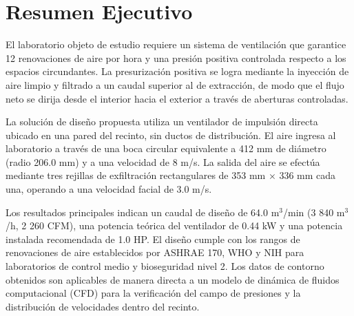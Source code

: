 \newpage
\section*{Resumen Ejecutivo}

El laboratorio objeto de estudio requiere un sistema de ventilación que garantice 12 renovaciones de aire por hora y una presión positiva controlada respecto a los espacios circundantes. La presurización positiva se logra mediante la inyección de aire limpio y filtrado a un caudal superior al de extracción, de modo que el flujo neto se dirija desde el interior hacia el exterior a través de aberturas controladas.

La solución de diseño propuesta utiliza un ventilador de impulsión directa ubicado en una pared del recinto, sin ductos de distribución. El aire ingresa al laboratorio a través de una boca circular equivalente a 412 mm de diámetro (radio 206.0 mm) y a una velocidad de 8 m/s. La salida del aire se efectúa mediante tres rejillas de exfiltración rectangulares de 353 mm $\times$ 336 mm cada una, operando a una velocidad facial de 3.0 m/s.

Los resultados principales indican un caudal de diseño de 64.0 m$^3$/min (3 840 m$^3$/h, 2 260 CFM), una potencia teórica del ventilador de 0.44 kW y una potencia instalada recomendada de 1.0 HP. El diseño cumple con los rangos de renovaciones de aire establecidos por ASHRAE 170, WHO y NIH para laboratorios de control medio y bioseguridad nivel 2. Los datos de contorno obtenidos son aplicables de manera directa a un modelo de dinámica de fluidos computacional (CFD) para la verificación del campo de presiones y la distribución de velocidades dentro del recinto.

\newpage
